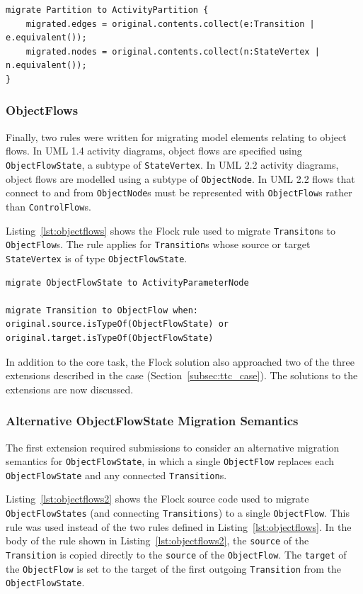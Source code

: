 \begin{lstlisting}[caption=Migrating Partitions, label=lst:partitions, language=Flock]
migrate Partition to ActivityPartition {
	migrated.edges = original.contents.collect(e:Transition | e.equivalent());
	migrated.nodes = original.contents.collect(n:StateVertex | n.equivalent());	
}
\end{lstlisting}


\subsubsection{ObjectFlows}
Finally, two rules were written for migrating model elements relating to object flows. In UML 1.4 activity diagrams, object flows are specified using \texttt{ObjectFlowState}, a subtype of \texttt{St\-at\-eVe\-rt\-ex}. In UML 2.2 activity diagrams, object flows are modelled using a subtype of \texttt{ObjectNode}. In UML 2.2 flows that connect to and from \texttt{ObjectNode}s must be represented with \texttt{ObjectFlow}s rather than \texttt{ControlFlow}s.

Listing~\ref{lst:objectflows} shows the Flock rule used to migrate \texttt{Transiton}s to \texttt{ObjectFlow}s. The rule applies for \texttt{Transition}s whose source or target \texttt{St\-at\-eVe\-rt\-ex} is of type \texttt{ObjectFlowState}.

\begin{lstlisting}[caption=Migrating ObjectFlows, label=lst:objectflows, language=Flock]
migrate ObjectFlowState to ActivityParameterNode

migrate Transition to ObjectFlow when: original.source.isTypeOf(ObjectFlowState) or original.target.isTypeOf(ObjectFlowState)
\end{lstlisting}

In addition to the core task, the Flock solution also approached two of the three extensions described in the case (Section~\ref{subsec:ttc_case}). The solutions to the extensions are now discussed.

\subsubsection{Alternative ObjectFlowState Migration Semantics}
The first extension required submissions to consider an alternative migration semantics for \texttt{ObjectFlowState}, in which a single \texttt{ObjectFlow} replaces each \texttt{ObjectFlowState} and any connected \texttt{Transition}s.

Listing~\ref{lst:objectflows2} shows the Flock source code used to migrate \texttt{ObjectFlowStates} (and connecting \texttt{Transitions}) to a single \texttt{ObjectFlow}. This rule was used instead of the two rules defined in Listing~\ref{lst:objectflows}. In the body of the rule shown in Listing~\ref{lst:objectflows2}, the \texttt{source} of the \texttt{Transition} is copied directly to the \texttt{source} of the \texttt{ObjectFlow}. The \texttt{target} of the \texttt{ObjectFlow} is set to the target of the first outgoing \texttt{Transition} from the \texttt{ObjectFlowState}. 

